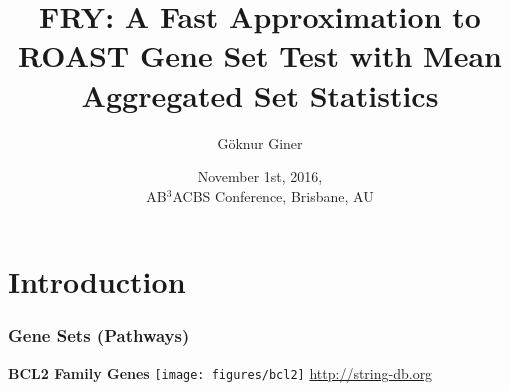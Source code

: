 \documentclass[9pt,t]{beamer}
\title{FRY: A Fast Approximation to ROAST Gene Set Test with Mean Aggregated Set Statistics}
\author[G\"{o}knur Giner]{G\"{o}knur Giner}
\date[November 1st, 2016]{November 1st, 2016,\\
AB$^3$ACBS Conference, Brisbane, AU}
\begin{document}
\begin{frame}[plain,t]
	\titlepage
\end{frame}

\section{Introduction}
\begin{frame}
	\frametitle{Gene Sets \textbf{\color{oxygenrose} (Pathways)}}
	\vspace{0.1cm}
\begin{minipage}[t][0.9\textheight][b]{0.6\textwidth}
\centering
\textbf{\color{oxygenpurple} BCL2 Family Genes}
\vspace{0.05cm}
\vfill
  \texttt{[image: figures/bcl2]}
  \vfill
\footnotesize \url{http://string-db.org}
\end{minipage}
\hspace{0.4cm}
\end{frame}
\end{document}
